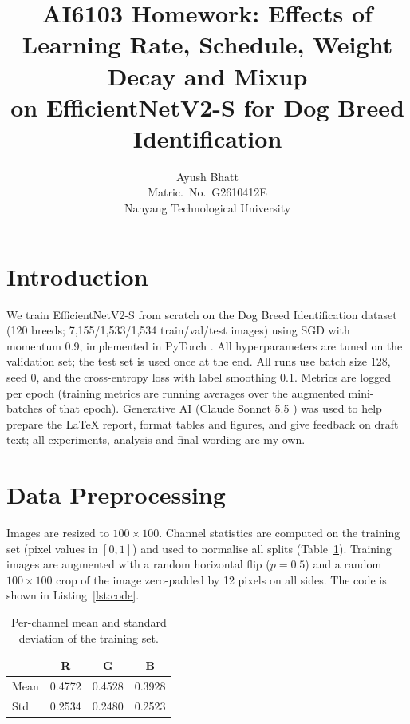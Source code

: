 \documentclass[letterpaper]{article}
\title{AI6103 Homework: Effects of Learning Rate, Schedule, Weight Decay and Mixup\\on EfficientNetV2-S for Dog Breed Identification}
\author{Ayush Bhatt\\Matric.\ No.\ G2610412E\\ Nanyang Technological University}
\begin{document}
\maketitle

\section{Introduction}
We train EfficientNetV2-S \cite{tan2021} from scratch on the Dog Breed Identification dataset \cite{dogbreed} (120 breeds; 7,155/1,533/1,534 train/val/test images) using SGD with momentum 0.9, implemented in PyTorch \cite{paszke2019}. All hyperparameters are tuned on the validation set; the test set is used once at the end. All runs use batch size 128, seed 0, and the cross-entropy loss with label smoothing 0.1. Metrics are logged per epoch (training metrics are running averages over the augmented mini-batches of that epoch). Generative AI (Claude Sonnet 5.5 \cite{claude2026}) was used to help prepare the LaTeX report, format tables and figures, and give feedback on draft text; all experiments, analysis and final wording are my own.


\section{Data Preprocessing}
Images are resized to $100\times100$. Channel statistics are computed on the training set (pixel values in $[0,1]$) and used to normalise all splits (Table~\ref{tab:norm}). Training images are augmented with a random horizontal flip ($p=0.5$) and a random $100\times100$ crop of the image zero-padded by 12 pixels on all sides. The code is shown in Listing~\ref{lst:code}.

\begin{table}[ht]
\centering
\footnotesize\setlength{\tabcolsep}{3pt}
\begin{tabular}{lccc}
\toprule
 & R & G & B\\
\midrule
Mean & 0.4772 & 0.4528 & 0.3928\\
Std & 0.2534 & 0.2480 & 0.2523\\
\bottomrule
\end{tabular}
\caption{Per-channel mean and standard deviation of the training set.}
\label{tab:norm}
\end{table}
\end{document}
